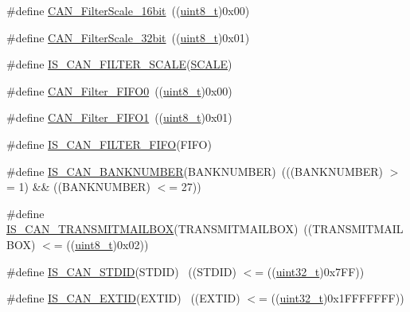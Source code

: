 \begin{DoxyCompactItemize}
\item 
\#define \hyperlink{group___c_a_n__filter__scale_ga9e0493937e73bcf9a4127eef2f255a95}{C\+A\+N\+\_\+\+Filter\+Scale\+\_\+16bit}~((\hyperlink{_p_e___types_8h_aba7bc1797add20fe3efdf37ced1182c5}{uint8\+\_\+t})0x00)
\item 
\#define \hyperlink{group___c_a_n__filter__scale_gac63dfb0e11713c59268ee9f4aebab60e}{C\+A\+N\+\_\+\+Filter\+Scale\+\_\+32bit}~((\hyperlink{_p_e___types_8h_aba7bc1797add20fe3efdf37ced1182c5}{uint8\+\_\+t})0x01)
\item 
\#define \hyperlink{group___c_a_n__filter__scale_gaf64c93166af0eb5ec7e804116f10783a}{I\+S\+\_\+\+C\+A\+N\+\_\+\+F\+I\+L\+T\+E\+R\+\_\+\+S\+C\+A\+LE}(\hyperlink{imu__loop_8c_a0cbea62f1ce2043dd08108e65ed8de1d}{S\+C\+A\+LE})
\item 
\#define \hyperlink{group___c_a_n__filter___f_i_f_o_ga8249c27978ca94676530540b88a6be8f}{C\+A\+N\+\_\+\+Filter\+\_\+\+F\+I\+F\+O0}~((\hyperlink{_p_e___types_8h_aba7bc1797add20fe3efdf37ced1182c5}{uint8\+\_\+t})0x00)
\item 
\#define \hyperlink{group___c_a_n__filter___f_i_f_o_gaab8478c89a607c4b8baf68efc730e316}{C\+A\+N\+\_\+\+Filter\+\_\+\+F\+I\+F\+O1}~((\hyperlink{_p_e___types_8h_aba7bc1797add20fe3efdf37ced1182c5}{uint8\+\_\+t})0x01)
\item 
\#define \hyperlink{group___c_a_n__filter___f_i_f_o_ga2df5ae0de841fc80c969e9147991ec9d}{I\+S\+\_\+\+C\+A\+N\+\_\+\+F\+I\+L\+T\+E\+R\+\_\+\+F\+I\+FO}(F\+I\+FO)
\item 
\#define \hyperlink{group___start__bank__filter__for__slave___c_a_n_ga7fb463088ff4cd584bba47e3d0a4f469}{I\+S\+\_\+\+C\+A\+N\+\_\+\+B\+A\+N\+K\+N\+U\+M\+B\+ER}(B\+A\+N\+K\+N\+U\+M\+B\+ER)~(((B\+A\+N\+K\+N\+U\+M\+B\+ER) $>$= 1) \&\& ((B\+A\+N\+K\+N\+U\+M\+B\+ER) $<$= 27))
\item 
\#define \hyperlink{group___c_a_n___tx_ga218b3e1380c4d49163c91a1af904e44c}{I\+S\+\_\+\+C\+A\+N\+\_\+\+T\+R\+A\+N\+S\+M\+I\+T\+M\+A\+I\+L\+B\+OX}(T\+R\+A\+N\+S\+M\+I\+T\+M\+A\+I\+L\+B\+OX)~((T\+R\+A\+N\+S\+M\+I\+T\+M\+A\+I\+L\+B\+OX) $<$= ((\hyperlink{_p_e___types_8h_aba7bc1797add20fe3efdf37ced1182c5}{uint8\+\_\+t})0x02))
\item 
\#define \hyperlink{group___c_a_n___tx_gad735591c3a6843cb433883a786c847b9}{I\+S\+\_\+\+C\+A\+N\+\_\+\+S\+T\+D\+ID}(S\+T\+D\+ID)  ~((S\+T\+D\+ID) $<$= ((\hyperlink{_p_e___types_8h_a33594304e786b158f3fb30289278f5af}{uint32\+\_\+t})0x7\+F\+F))
\item 
\#define \hyperlink{group___c_a_n___tx_ga028f9bf48927727a83215606d897e678}{I\+S\+\_\+\+C\+A\+N\+\_\+\+E\+X\+T\+ID}(E\+X\+T\+ID)  ~((E\+X\+T\+ID) $<$= ((\hyperlink{_p_e___types_8h_a33594304e786b158f3fb30289278f5af}{uint32\+\_\+t})0x1\+F\+F\+F\+F\+F\+F\+F))

\end{DoxyCompactItemize}
